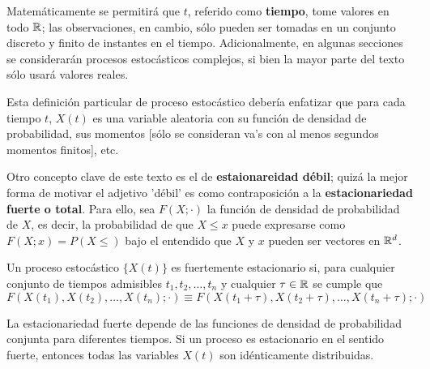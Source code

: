 \documentclass[12pt,a4paper]{mitthesis}
\begin{document}
Matem\'aticamente se permitir\'a que $t$, referido como \textbf{tiempo}, tome valores 
en todo $\mathbb{R}$; las observaciones, en cambio,
s\'olo pueden ser tomadas en un conjunto discreto y finito de instantes en el tiempo. 
Adicionalmente, en algunas secciones se considerar\'an procesos estoc\'asticos complejos,
si bien la mayor parte del texto s\'olo usar\'a valores reales.

Esta definici\'on particular de proceso estoc\'astico deber\'ia enfatizar que para cada 
tiempo $t$, $X(t)$ es una variable aleatoria con su funci\'on de densidad de probabilidad,
sus momentos [s\'olo se consideran va's con al menos segundos momentos finitos], etc.

Otro concepto clave de este texto es el de \textbf{estaionareidad d\'ebil}; 
quiz\'a la mejor forma de motivar el adjetivo 'd\'ebil' es como contraposici\'on a 
la \textbf{estacionariedad fuerte o total}. 
Para ello, sea $F(X;\cdot)$ la funci\'on de densidad de probabilidad de $X$, es decir, 
la probabilidad de que $X\leq x$ puede expresarse como 
$
F(X;x) = P(X\leq)
$
bajo el entendido que $X$ y $x$ pueden ser vectores en $\mathbb{R}^{d}$.

\begin{defn}
Un proceso estoc\'astico $\{ X(t) \}$ es fuertemente estacionario si, para cualquier 
conjunto de tiempos admisibles $t_1,t_2,\dots,t_n$ y cualquier $\tau \in \mathbb{R}$
se cumple que
\begin{equation*}
F\left(X(t_1),X(t_2),\dots,X(t_n);\cdot\right) 
\equiv
F\left(X(t_1+\tau),X(t_2+\tau),\dots,X(t_n+\tau);\cdot\right)
\end{equation*}
\end{defn}

La estacionariedad fuerte depende de las funciones de densidad de probabilidad conjunta para
diferentes tiempos. 
Si un proceso es estacionario en el sentido fuerte, entonces todas las variables $X(t)$ son 
id\'enticamente distribuidas.
\end{document}
